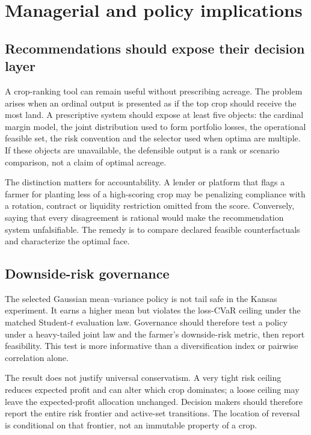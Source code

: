 \section{Managerial and policy implications}

\subsection{Recommendations should expose their decision layer}

A crop-ranking tool can remain useful without prescribing acreage. The problem
arises when an ordinal output is presented as if the top crop should receive
the most land. A prescriptive system should expose at least five objects: the
cardinal margin model, the joint distribution used to form portfolio losses,
the operational feasible set, the risk convention and the selector used when
optima are multiple. If these objects are unavailable, the defensible output
is a rank or scenario comparison, not a claim of optimal acreage.

The distinction matters for accountability. A lender or platform that flags a
farmer for planting less of a high-scoring crop may be penalizing compliance
with a rotation, contract or liquidity restriction omitted from the score.
Conversely, saying that every disagreement is rational would make the
recommendation system unfalsifiable. The remedy is to compare declared
feasible counterfactuals and characterize the optimal face.

\subsection{Downside-risk governance}

The selected Gaussian mean--variance policy is not tail safe in the Kansas
experiment. It earns a higher mean but violates the loss-CVaR ceiling under
the matched Student-\(t\) evaluation law. Governance should therefore test a
policy under a heavy-tailed joint law and the farmer's downside-risk metric,
then report feasibility. This test is more informative than a diversification
index or pairwise correlation alone.

The result does not justify universal conservatism. A very tight risk ceiling
reduces expected profit and can alter which crop dominates; a loose ceiling
may leave the expected-profit allocation unchanged. Decision makers should
therefore report the entire risk frontier and active-set transitions. The
location of reversal is conditional on that frontier, not an immutable
property of a crop.

